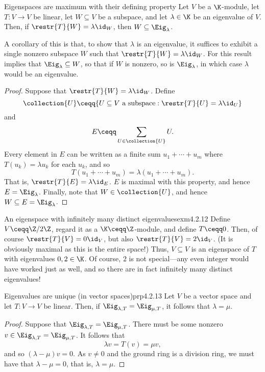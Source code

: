 \begin{prp}{Eigenspaces are maximum with their defining property}{}
	Let $V$ be a $\K$-module, let $T\colon V\rightarrow V$ be linear, let $W\subseteq V$ be a subspace, and let $\lambda \in \K$ be an eigenvalue of $V$.  Then, if $\restr{T}{W}=\lambda \id _W$, then $W\subseteq \Eig _{\lambda}$.
	\begin{rmk}
		A corollary of this is that, to show that $\lambda$ is an eigenvalue, it suffices to exhibit a single nonzero subspace $W$ such that $\restr{T}{W}=\lambda \id _W$.  For this result implies that $\Eig _{\lambda}\subseteq W$, so that if $W$ is nonzero, so is $\Eig _{\lambda}$, in which case $\lambda$ would be an eigenvalue.
	\end{rmk}
	\begin{proof}
		Suppose that $\restr{T}{W}=\lambda \id _W$.  Define
		\begin{equation}
			\collection{U}\ceqq \{ U\subseteq V\text{ a subspace}:\restr{T}{U}=\lambda \id _U\} 
		\end{equation}
		and
		\begin{equation}
			E\ceqq \sum _{U\in \collection{U}}U.
		\end{equation}
		Every element in $E$ can be written as a finite sum $u_1+\cdots +u_m$ where $T(u_k)=\lambda u_k$ for each $u_k$, and so
		\begin{equation}
			T(u_1+\cdots +u_m)=\lambda (u_1+\cdots +u_m).
		\end{equation}
		That is, $\restr{T}{E}=\lambda \id _E$.  $E$ is maximal with this property, and hence $E=\Eig _{\lambda}$.  Finally, note that $W\in \collection{U}$, and hence $W\subseteq E=\Eig _{\lambda}$. 
	\end{proof}
\end{prp}
\begin{exm}{An eigenspace with infinitely many distinct eigenvalues}{exm4.2.12}
	Define $V\ceqq \Z /2\Z$, regard it as a $\K \ceqq \Z$-module, and define $T\ceqq 0$.  Then, of course $\restr{T}{V}=0\id _V$, but also $\restr{T}{V}=2\id _V$.  (It is obviously maximal as this is the entire space!)  Thus, $V\subseteq V$ is an eigenspace of $T$ with eigenvalues $0,2\in \K$.  Of course, $2$ is not special---any even integer would have worked just as well, and so there are in fact infinitely many distinct eigenvalues!
\end{exm}
\begin{prp}{Eigenvalues are unique (in vector spaces)}{prp4.2.13}
	Let $V$ be a vector space and let $T\colon V\rightarrow V$ be linear.  Then, if $\Eig _{\lambda ,T}=\Eig _{\mu ,T}$, it follows that $\lambda =\mu$.
	\begin{proof}
		Suppose that $\Eig _{\lambda ,T}=\Eig _{\mu ,T}$.  There must be some nonzero $v\in \Eig _{\lambda ,T}=\Eig _{\mu ,T}$.  It follows that
		\begin{equation}
			\lambda v=T(v)=\mu v,
		\end{equation}
		and so $(\lambda -\mu )v=0$.  As $v\neq 0$ and the ground ring is a division ring, we must have that $\lambda -\mu =0$, that is, $\lambda =\mu$.
	\end{proof}
\end{prp}

